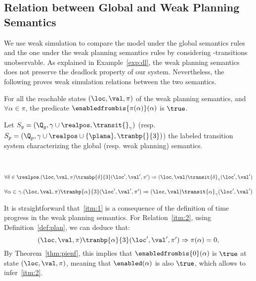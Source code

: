 \subsection{Relation between Global and Weak Planning Semantics}
We use weak simulation to compare the model under
the global semantics rules and the one under the weak planning semantics rules
by considering \plana-transitions unobservable.
As explained in Example~\ref{exp:dl}, the weak planning semantics does not preserve the deadlock property of our system.
Nevertheless, the following proves weak simulation relations between the two semantics.

\begin{theorem}\label{thm:pienf}
  For all the reachable states $(\loc,\val,\pi)$ of the weak planning semantics, and $\forall\alpha\in\pi$, the
  predicate $\enabledfrombis{\pi(\alpha)}(\alpha)$ is $\true$.
\end{theorem}

Let $S_g=(\Q_g,\gamma\cup\realpos,\transit{}_{\gamma})$ (resp. $S_{p}=(\Q_{p},\gamma\cup\realpos\cup\{\plana\},\tranbp{}{3})$)
the labeled transition system characterizing the global (resp. weak planning) semantics. 
\begin{proposition}\mbox{}\\
  \vspace{-6mm}
  \begin{description}[labelwidth=1.5cm]
    \item[\namedlabel{itm:1}{Relation 1}]$\forall\delta\in\realpos.(\loc,\val,\pi)\tranbp{\delta}{3}(\loc',\val',\pi')
      \Rightarrow (\loc,\val)\transit{\delta}_{\gamma}(\loc',\val')$
    \item[\namedlabel{itm:2}{Relation 2}]$\forall\alpha\in\gamma.(\loc,\val,\pi)\tranbp{\alpha}{3}(\loc',\val',\pi')
      \Rightarrow (\loc,\val)\transit{\alpha}_{\gamma}(\loc',\val')$
  \end{description}
\end{proposition}
It is straightforward that~\ref{itm:1} is a consequence of the definition of time progress in the weak planning semantics. For Relation~\ref{itm:2},  
using Definition~\ref{def:plan}, we can deduce that:\\
\begin{displaymath}
(\loc,\val,\pi)\tranbp{\alpha}{3}(\loc',\val',\pi')\Rightarrow \pi(\alpha)=0,
\end{displaymath}
By Theorem~\ref{thm:pienf}, this implies that $\enabledfrombis{0}(\alpha)$ is $\true$ at state $(\loc,\val,\pi)$, meaning that $\enabled(\alpha)$ is
also $\true$, which allows to infer~\ref{itm:2}.  

